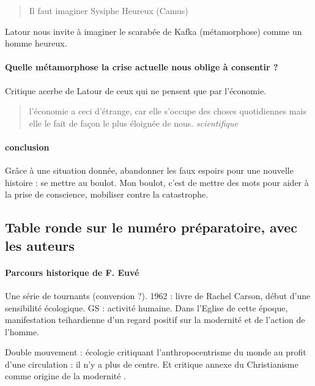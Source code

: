 \begin{quote}
    Il faut imaginer Sysiphe Heureux (Camus)
\end{quote}
Latour nous invite à imaginer le scarabée de Kafka (métamorphose) comme un homme heureux.

\paragraph{Quelle métamorphose la crise actuelle nous oblige à consentir ?} Critique acerbe de Latour de ceux qui ne pensent que par l'économie. 
\begin{quote}
    l'économie a ceci d'étrange, car elle s'occupe des choses quotidiennes mais elle le fait de façon le plus éloignée de nous. \textit{scientifique}
\end{quote}

\paragraph{conclusion}
Grâce à une situation donnée, abandonner les faux espoirs pour une nouvelle histoire : se mettre au boulot. Mon boulot, c'est de mettre des mots pour aider à la prise de conscience, mobiliser contre la catastrophe. 

 \subsection{Table ronde sur le numéro préparatoire, avec les auteurs}

\paragraph{Parcours historique de F. Euvé} Une série de tournants (conversion ?). 1962 : livre de Rachel Carson, début d'une sensibilité écologique. GS : activité humaine. Dans l'Eglise de cette époque, manifestation teihardienne d'un regard positif sur la modernité et de l'action de l'homme.

Double mouvement : écologie critiquant l'anthropocentrisme du monde au profit d'une circulation : il n'y a plus de centre. Et critique annexe du Christianisme comme origine de la modernité .

